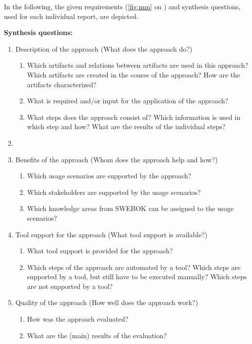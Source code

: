 In the following, the given requirements (\autoref{fig:mm} on ) and synthesis questions, used for each individual report, are depicted.

\newpage
\textbf{Synthesis questions:}

\begin{enumerate}
	\item Description of the approach (What does the approach do?)
	\begin{enumerate}
		\item Which artifacts and relations between artifacts are used in this approach? Which artifacts are created in the course of the approach? How are the artifacts characterized?
		\item What is required and/or input for the application of the approach?
		\item What steps does the approach consist of? Which information is used in which step and how? What are the results of the individual steps?
	\end{enumerate}
	\item[] 
	\item Benefits of the approach (Whom does the approach help and how?)
	\begin{enumerate}
		\item Which usage scenarios are supported by the approach?
		\item Which stakeholders are supported by the usage scenarios?
		\item Which knowledge areas from SWEBOK can be assigned to the usage scenarios?
	\end{enumerate}
	\item Tool support for the approach (What tool support is available?)
	\begin{enumerate}
		\item What tool support is provided for the approach?
		\item Which steps of the approach are automated by a tool? Which steps are supported by a tool, but still have to be executed manually? Which steps are not supported by a tool?
	\end{enumerate}
	\item Quality of the approach (How well does the approach work?)
	\begin{enumerate}
		\item How was the approach evaluated?
		\item What are the (main) results of the evaluation?
	\end{enumerate}
\end{enumerate}


